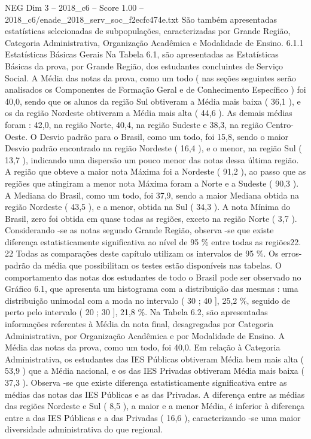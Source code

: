 \begin{textsample}{NEG Dim 3 – 2018\_c6 – Score 1.00 – 2018\_c6/enade\_2018\_serv\_soc\_f2ecfc474e.txt}
São também apresentadas estatísticas selecionadas de subpopulações, caracterizadas por Grande Região, Categoria Administrativa, Organização Acadêmica e Modalidade de Ensino. 6.1.1 Estatísticas Básicas Gerais Na Tabela 6.1, são apresentadas as Estatísticas Básicas da prova, por Grande Região, dos estudantes concluintes de Serviço Social.
A Média das notas da prova, como um todo ( nas seções seguintes serão analisados os Componentes de Formação Geral e de Conhecimento Específico ) foi 40,0, sendo que os alunos da região Sul obtiveram a Média mais baixa ( 36,1 ), e os da região Nordeste obtiveram a Média mais alta ( 44,6 ).
As demais médias foram : 42,0, na região Norte, 40,4, na região Sudeste e 38,3, na região Centro-Oeste.
O Desvio padrão para o Brasil, como um todo, foi 15,8, sendo o maior Desvio padrão encontrado na região Nordeste ( 16,4 ), e o menor, na região Sul ( 13,7 ), indicando uma dispersão um pouco menor das notas dessa última região.
A região que obteve a maior nota Máxima foi a Nordeste ( 91,2 ), ao passo que as regiões que atingiram a menor nota Máxima foram a Norte e a Sudeste ( 90,3 ).
A Mediana do Brasil, como um todo, foi 37,9, sendo a maior Mediana obtida na região Nordeste ( 43,5 ), e a menor, obtida na Sul ( 34,3 ).
A nota Mínima do Brasil, zero foi obtida em quase todas as regiões, exceto na região Norte ( 3,7 ).
Considerando -se as notas segundo Grande Região, observa -se que existe diferença estatisticamente significativa ao nível de 95 \% entre todas as regiões22. 22 Todas as comparações deste capítulo utilizam os intervalos de 95 \%.
Os erros-padrão da média que possibilitam os testes estão disponíveis nas tabelas.
O comportamento das notas dos estudantes de todo o Brasil pode ser observado no Gráfico 6.1, que apresenta um histograma com a distribuição das mesmas : uma distribuição unimodal com a moda no intervalo ( 30 ; 40 ], 25,2 \%, seguido de perto pelo intervalo ( 20 ; 30 ], 21,8 \%.
Na Tabela 6.2, são apresentadas informações referentes à Média da nota final, desagregadas por Categoria Administrativa, por Organização Acadêmica e por Modalidade de Ensino.
A Média das notas da prova, como um todo, foi 40,0.
Em relação à Categoria Administrativa, os estudantes das IES Públicas obtiveram Média bem mais alta ( 53,9 ) que a Média nacional, e os das IES Privadas obtiveram Média mais baixa ( 37,3 ).
Observa -se que existe diferença estatisticamente significativa entre as médias das notas das IES Públicas e as das Privadas.
A diferença entre as médias das regiões Nordeste e Sul ( 8,5 ), a maior e a menor Média, é inferior à diferença entre a das IES Públicas e a das Privadas ( 16,6 ), caracterizando -se uma maior diversidade administrativa do que regional.

\end{textsample}
